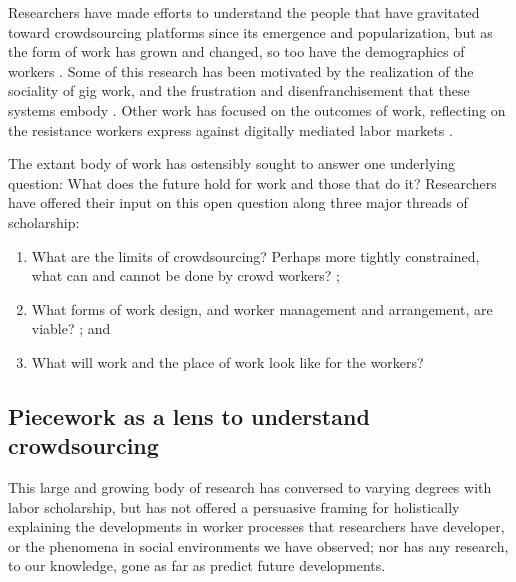 \documentclass[trackingWork]{subfiles}
\begin{document}
Researchers have made efforts to understand the people
that have gravitated toward crowdsourcing platforms
since its emergence and popularization,
but as the form of work has grown and changed, so too have the demographics of workers
\cite{Ross,whoareNOTtheTurkers}.
Some of this research has been motivated by the realization of the sociality of gig work,
and the frustration and disenfranchisement that these systems embody
\cite{turkopticon,dynamo}.
Other work has focused on the outcomes of work,
reflecting on the resistance workers express against digitally mediated labor markets
\cite{uberAlgorithm}.

The extant body of work has ostensibly sought to answer one underlying question:
What does the future hold for work and those that do it? %
Researchers have offered their input on this open question along three major threads of scholarship:
\begin{enumerate}
  \item What are the limits of crowdsourcing?
  Perhaps more tightly constrained,
  what can and cannot be done by crowd workers?
    \cite{foundry,suzukiAtelier,KimStoria,yuanAlmost,YuEncouragingOutside,embracingErrorKrishna,
          Nebeling:2016:WCW:2858036.2858169,Hahn:2016:KAB:2858036.2858364};
  \item What forms of work design, and worker management and arrangement, are viable?
    \cite{bernsteinSoylent,sensitiveTasks,LykourentzouPersonalityMatters,KucherbaevReLauncher,
          Law:2016:CKC:2858036.2858144,Cai:2016:CRI:2858036.2858237,
          Chang:2016:ACC:2858036.2858411,Newell:2016:OMA:2858036.2858490}; and%
  \item What will work and the place of work look like for the workers?
    \cite{turkopticon,storiesIraniSilberman,dynamo,crowdcollab,whyWouldAnyoneBrewer,
          takingAHITMcInnis}
\end{enumerate}


\subsection{Piecework as a lens to understand crowdsourcing}
This large and growing body of research has conversed
to varying degrees with labor scholarship,
but has not offered a persuasive framing for holistically explaining
the developments in worker processes that researchers have developer, or
the phenomena in social environments we have observed;
nor has any research, to our knowledge,
gone as far as predict future developments.
\end{document}
